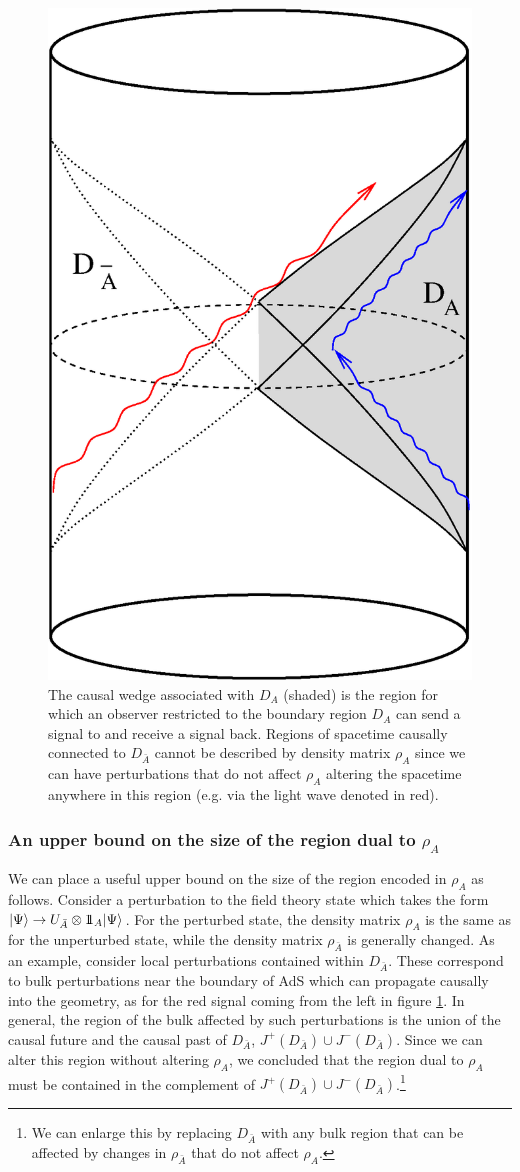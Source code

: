 \documentclass[12pt,epsf]{article}
\def\identity{{\rlap{1} \hskip 1.6pt \hbox{1}}}
\begin{document}
\begin{figure}
\centering
\includegraphics[width = 0.3 \textwidth]{Causal.eps}
\caption{The causal wedge associated with $D_A$ (shaded) is the region for which an observer restricted to the boundary region $D_A$ can send a signal to and receive a signal back. Regions of spacetime causally connected to $D_{\bar{A}}$ cannot be described by density matrix $\rho_A$ since we can have perturbations that do not affect $\rho_A$ altering the spacetime anywhere in this region (e.g. via the light wave denoted in red).}
\label{Causal}
\end{figure}

\subsubsection*{An upper bound on the size of the region dual to $\rho_A$}

We can place a useful upper bound on the size of the region encoded in $\rho_A$ as follows. Consider a perturbation to the field theory state which takes the form $|\Psi \rangle \to U_{\bar{A}} \otimes \identity_A |\Psi \rangle$. For the perturbed state, the density matrix $\rho_A$ is the same as for the unperturbed state, while the density matrix $\rho_{\bar{A}}$ is generally changed. As an example, consider local perturbations contained within $D_{\bar{A}}$. These correspond to bulk perturbations near the boundary of AdS which can propagate causally into the geometry, as for the red signal coming from the left in figure \ref{Causal}. In general, the region of the bulk affected by such perturbations is the union of the causal future and the causal past of $D_{\bar{A}}$, $J^+(D_{\bar{A}}) \cup J^-(D_{\bar{A}})$. Since we can alter this region without altering $\rho_A$, we concluded that the region dual to $\rho_A$ must be contained in the complement of $J^+(D_{\bar{A}}) \cup J^-(D_{\bar{A}})$.\footnote{We can enlarge this by replacing $D_{\bar{A}}$ with any bulk region that can be affected by changes in $\rho_{\bar{A}}$ that do not affect $\rho_A$.}
\end{document}
